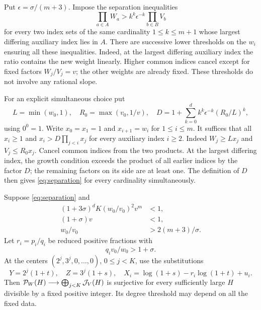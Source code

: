 Put \(\epsilon=\sigma/(m+3)\). Impose the separation inequalities
\begin{equation}\label{eq:separation}
 \prod_{a\in A}W_a>
       k^k\epsilon^{-k}\prod_{b\in B}V_b
\end{equation}
for every two index sets of the same cardinality
\(1\leq k\leq m+1\) whose largest differing auxiliary index lies
in \(A\). There are successive lower thresholds on the \(w_i\)
ensuring all these inequalities. Indeed, at the largest differing
auxiliary index the ratio contains the new weight linearly. Higher
common indices cancel except for fixed factors \(W_j/V_j=v\);
the other weights are already fixed. These thresholds do not involve
any rational slope.

For an explicit simultaneous choice put
\[
 L=\min(w_0,1),\quad R_0=\max(v_0,1/v),\quad
 D=1+\sum_{k=0}^{d}k^k\epsilon^{-k}(R_0/L)^k,
\]
using \(0^0=1\). Write \(x_0=x_1=1\) and \(x_{i+1}=w_i\)
for \(1\le i\le m\). It suffices that all \(x_i\ge1\) and
\(x_i>D\prod_{j<i}x_j\) for every auxiliary index \(i\ge2\).
Indeed \(W_j\ge Lx_j\) and \(V_j\le R_0x_j\). Cancel common
indices from the two products. At the largest differing index, the
growth condition exceeds the product of all earlier indices by the
factor \(D\); the remaining factors on its side are at least one.
The definition of \(D\) then gives \eqref{eq:separation} for every
cardinality simultaneously.

\begin{proposition}\label{prop:interpolation}
Suppose \eqref{eq:separation} and
\begin{align}
 (1+3\sigma)^d K(w_0/v_0)^2v^m&<1,\label{eq:volume}\\
 (1+\sigma)v&<1,\label{eq:shrink}\\
 w_0/v_0&>2(m+3)/\sigma.\label{eq:basegap}
\end{align}
Let \(r_i=p_i/q_i\) be reduced positive fractions with
\begin{equation}\label{eq:qcondition}
                         q_i v_0/w_0>1+\sigma.
\end{equation}
At the centers \((2^j,3^j,0,\ldots,0)\), \(0\leq j<K\), use
the substitutions
\begin{equation}\label{eq:jets}
 Y=2^j(1+t),\quad Z=3^j(1+s),\quad
 X_i=\log(1+s)-r_i\log(1+t)+u_i.
\end{equation}
Then \(\mathcal P_W(H)\longrightarrow\bigoplus_{j<K}\mathcal J_V(H)\) is
surjective for every sufficiently large \(H\) divisible by a fixed
positive integer. Its degree threshold may depend on all the fixed data.
\end{proposition}

